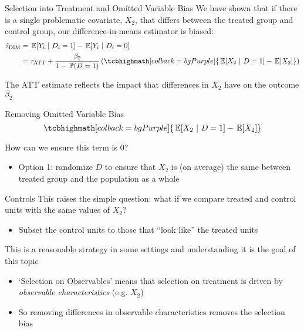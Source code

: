 \documentclass[aspectratio=169,t,11pt,table]{beamer}
\begin{document}
\begin{frame}[fragile]{Selection into Treatment and Omitted Variable Bias}
  We have shown that if there is a single problematic covariate, $X_2$, that differs between the treated group and control group, our difference-in-means estimator is biased:
  \begin{align*}
    \hat{\tau}_{\text{DIM}} &= 
    \expec{Y_{i}}{D_i = 1} - \expec{Y_{i}}{D_i = 0} \\
    &= \tau_{\text{ATT}} + \frac{\beta_2}{1 - \prob{D = 1}} \left( \tcbhighmath[colback = bgPurple]{\expec{X_2}{D = 1} - \expec{X_2}} \right)
  \end{align*}

  \pause
  \bigskip
  The ATT estimate reflects the impact that differences in $X_2$ have on the outcome $\beta_2$
\end{frame}

\begin{frame}{Removing Omitted Variable Bias}
  \vspace*{-\bigskipamount}
  $$
    \tcbhighmath[colback = bgPurple]{\expec{X_2}{D = 1} - \expec{X_2}}
  $$

  How can we ensure this term is 0? 
  \begin{itemize}
    \item Option 1: randomize $D$ to ensure that $X_2$ is (on average) the same between treated group and the population as a whole
  \end{itemize}
\end{frame}

\begin{frame}{Controls}
  This raises the simple question: what if we compare treated and control units with the same values of $X_2$?
  \begin{itemize}
    \item Subset the control units to those that ``look like'' the treated units
  \end{itemize}

  \pause
  \bigskip
  This is a reasonable strategy in some settings and understanding it is the goal of this topic
  \begin{itemize}
    \item `Selection on Observables' means that selection on treatment is driven by \emph{\alert{observable characteristics}} (e.g. $X_2$)
    
    \item So removing differences in observable characteristics removes the selection bias
  \end{itemize}
\end{frame}
\end{document}
